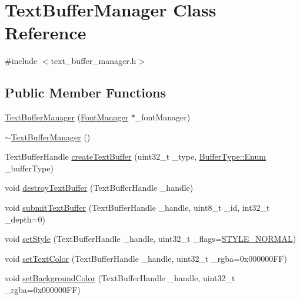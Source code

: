 \hypertarget{class_text_buffer_manager}{\section{Text\+Buffer\+Manager Class Reference}
\label{class_text_buffer_manager}
}


{\ttfamily \#include $<$text\+\_\+buffer\+\_\+manager.\+h$>$}

\subsection*{Public Member Functions}
\begin{DoxyCompactItemize}
\item 
\hyperlink{class_text_buffer_manager_a5fd44704617e0be71bd38975987a3577}{Text\+Buffer\+Manager} (\hyperlink{class_font_manager}{Font\+Manager} $\ast$\+\_\+font\+Manager)
\item 
\hyperlink{class_text_buffer_manager_abbb2854ff5abdca74e863b3a02c58529}{$\sim$\+Text\+Buffer\+Manager} ()
\item 
Text\+Buffer\+Handle \hyperlink{class_text_buffer_manager_a5170b80d9986a2b8398b1657645aca28}{create\+Text\+Buffer} (uint32\+\_\+t \+\_\+type, \hyperlink{struct_buffer_type_af6eec2447862f2bd9c1f36408176ddda}{Buffer\+Type\+::\+Enum} \+\_\+buffer\+Type)
\item 
void \hyperlink{class_text_buffer_manager_a7f29cd35e4df9cb7fe3f1b31026d5106}{destroy\+Text\+Buffer} (Text\+Buffer\+Handle \+\_\+handle)
\item 
void \hyperlink{class_text_buffer_manager_a388121f70216d192c0f63e53b107c946}{submit\+Text\+Buffer} (Text\+Buffer\+Handle \+\_\+handle, uint8\+\_\+t \+\_\+id, int32\+\_\+t \+\_\+depth=0)
\item 
void \hyperlink{class_text_buffer_manager_ab73112a2456a4fe2f353a46a81a8cb43}{set\+Style} (Text\+Buffer\+Handle \+\_\+handle, uint32\+\_\+t \+\_\+flags=\hyperlink{text__buffer__manager_8h_a41440449340237d5eb6b0c4f7357bd35ac828230a58c9428e9da9cf9e5f440813}{S\+T\+Y\+L\+E\+\_\+\+N\+O\+R\+M\+A\+L})
\item 
void \hyperlink{class_text_buffer_manager_ac85ac034da9be4c44ebc1ddd35add225}{set\+Text\+Color} (Text\+Buffer\+Handle \+\_\+handle, uint32\+\_\+t \+\_\+rgba=0x000000\+F\+F)
\item 
void \hyperlink{class_text_buffer_manager_a70b428b73e98290449bb588bc7eba124}{set\+Background\+Color} (Text\+Buffer\+Handle \+\_\+handle, uint32\+\_\+t \+\_\+rgba=0x000000\+F\+F)

\end{DoxyCompactItemize}
